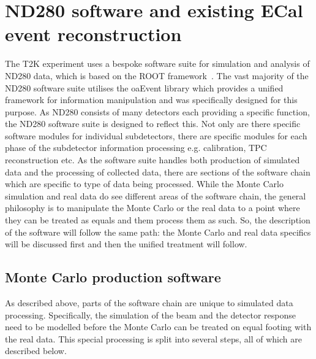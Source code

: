 \chapter{ND280 software and existing ECal event reconstruction}
\label{chap:ND280Software}
The T2K experiment uses a bespoke software suite for simulation and analysis of ND280 data, which is based on the ROOT framework~\cite{Brun199781}.  The vast majority of the ND280 software suite utilises the oaEvent library which provides a unified framework for information manipulation and was specifically designed for this purpose.
As ND280 consists of many detectors each providing a specific function, the ND280 software suite is designed to reflect this.  Not only are there specific software modules for individual subdetectors, there are specific modules for each phase of the subdetector information processing e.g.  calibration, TPC reconstruction etc.  
\newline
\newline
As the software suite handles both production of simulated data and the processing of collected data, there are sections of the software chain which are specific to type of data being processed.  While the Monte Carlo simulation and real data do see different areas of the software chain, the general philosophy is to manipulate the Monte Carlo or the real data to a point where they can be treated as equals and them process them as such.  So, the description of the software will follow the same path: the Monte Carlo and real data specifics will be discussed first and then the unified treatment will follow. 
\section{Monte Carlo production software}
\label{sec:MCchain}
As described above, parts of the software chain are unique to simulated data processing.  Specifically, the simulation of the beam and the detector response need to be modelled before the Monte Carlo can be treated on equal footing with the real data.  This special processing is split into several steps, all of which are described below.

